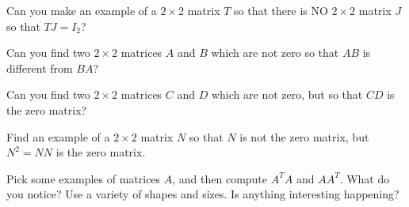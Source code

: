 \documentclass[elementsmain.tex]{subfiles}
\begin{document}
\begin{exercise} Can you make an example of a $2\times 2$ matrix $T$ so that there is NO $2\times 2$ matrix $J$ so that $TJ=I_2$?
\end{exercise}

\begin{exercise} Can you find two $2\times 2$ matrices $A$ and $B$ which are not zero so that $AB$ is different from $BA$?
\end{exercise}

\begin{exercise} Can you find two $2\times 2$ matrices $C$ and $D$ which are not zero, but so that $CD$ is the zero matrix? 
\end{exercise}

\begin{exercise} Find an example of a $2\times 2$ matrix $N$ so that $N$ is not the zero matrix, but $N^2 = NN$ is the zero matrix.
\end{exercise}

\begin{exercise} Pick some examples of matrices $A$, and then compute $A^TA$ and $AA^T$. What do you notice? Use a variety of shapes and sizes. Is anything interesting happening?
\end{exercise}

\clearpage
\end{document}
